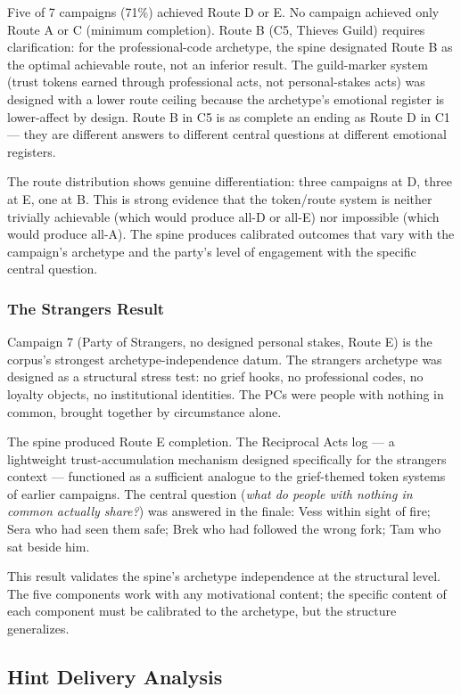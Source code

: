 Five of 7 campaigns (71\%) achieved Route D or E. No campaign achieved only
Route A or C (minimum completion). Route B (C5, Thieves Guild) requires
clarification: for the professional-code archetype, the spine designated Route B
as the optimal achievable route, not an inferior result. The guild-marker system
(trust tokens earned through professional acts, not personal-stakes acts) was
designed with a lower route ceiling because the archetype's emotional register
is lower-affect by design. Route B in C5 is as complete an ending as Route D
in C1 --- they are different answers to different central questions at different
emotional registers.

The route distribution shows genuine differentiation: three campaigns at D,
three at E, one at B. This is strong evidence that the token/route system is
neither trivially achievable (which would produce all-D or all-E) nor impossible
(which would produce all-A). The spine produces calibrated outcomes that
vary with the campaign's archetype and the party's level of engagement with
the specific central question.

\subsubsection{The Strangers Result}

Campaign 7 (Party of Strangers, no designed personal stakes, Route E) is the
corpus's strongest archetype-independence datum. The strangers archetype was
designed as a structural stress test: no grief hooks, no professional codes,
no loyalty objects, no institutional identities. The PCs were people with nothing
in common, brought together by circumstance alone.

The spine produced Route E completion. The Reciprocal Acts log --- a lightweight
trust-accumulation mechanism designed specifically for the strangers context ---
functioned as a sufficient analogue to the grief-themed token systems of earlier
campaigns. The central question (\textit{what do people with nothing in common
actually share?}) was answered in the finale: Vess within sight of fire; Sera
who had seen them safe; Brek who had followed the wrong fork; Tam who sat beside him.

This result validates the spine's archetype independence at the structural level.
The five components work with any motivational content; the specific content of
each component must be calibrated to the archetype, but the structure generalizes.

\subsection{Hint Delivery Analysis}

